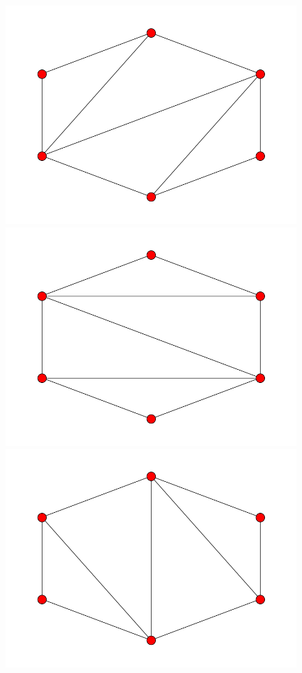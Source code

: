 \documentclass[fontsize=10pt]{article}
\begin{document}
\begin{enumerate}
\begin{figure}[hbtp]
\includegraphics[scale=0.1]{imgs/hexagon/hexagon_10.png}
\includegraphics[scale=0.1]{imgs/hexagon/hexagon_11.png}
\includegraphics[scale=0.1]{imgs/hexagon/hexagon_12.png}

\end{figure}
\end{enumerate}
\end{document}
